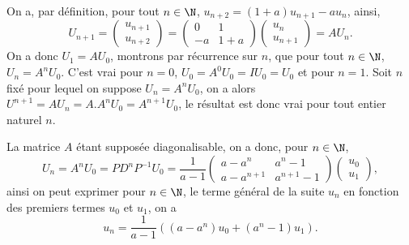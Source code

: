 {\begin{enumerate}
{On a, par d\'efinition, pour tout $n\in\N$, $u_{n+2}=(1+a)u_{n+1}-au_n$, ainsi, 
$$U_{n+1}=\begin{pmatrix}u_{n+1} \\  u_{n+2}\end{pmatrix}=\begin{pmatrix}0&1 \\  -a&1+a\end{pmatrix}\begin{pmatrix}u_{n} \\  u_{n+1}\end{pmatrix}=AU_n.$$
On a donc $U_1=AU_0$, montrons par r\'ecurrence sur $n$, que pour tout $n\in\N$, $U_n=A^nU_0$. C'est vrai pour $n=0$, $U_0=A^0U_0=IU_0=U_0$ et pour $n=1$. Soit $n$ fix\'e pour lequel on suppose $U_n=A^nU_0$, on a alors $U^{n+1}=AU_n=A.A^nU_0=A^{n+1}U_0$, le r\'esultat est donc vrai pour tout entier naturel $n$.

La matrice $A$ \'etant suppos\'ee diagonalisable, on a donc, pour $n\in\N$,
$$U_n=A^nU_0=PD^nP^{-1}U_0={\frac {1}{a-1}}\begin{pmatrix}a-a^n&a^n-1 \\  a-a^{n+1}&a^{n+1}-1\end{pmatrix}\begin{pmatrix}u_{0} \\  u_{1}\end{pmatrix},$$
ainsi on peut exprimer pour $n\in\N$, le terme g\'en\'eral de la suite $u_n$ en fonction des premiers termes $u_0$ et $u_1$, on a 
$$u_n={\frac{1} {a-1}}\left((a-a^n)u_0+(a^n-1)u_1\right).$$}
\end{enumerate}
}